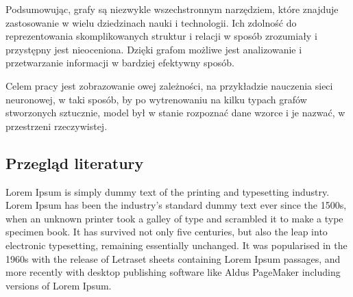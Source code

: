 Podsumowując, grafy są niezwykle wszechstronnym narzędziem, które znajduje zastosowanie w wielu dziedzinach nauki i technologii.
Ich zdolność do reprezentowania skomplikowanych struktur i relacji w sposób zrozumiały i przystępny jest nieoceniona.
Dzięki grafom możliwe jest analizowanie i przetwarzanie informacji w bardziej efektywny sposób. 

Celem pracy jest zobrazowanie owej zależności, na przykładzie nauczenia sieci neuronowej,
w taki sposób, by po wytrenowaniu na kilku typach grafów stworzonych sztucznie,
model był w stanie rozpoznać dane wzorce i je nazwać, w przestrzeni rzeczywistej.

\subsection{Przegląd literatury}
Lorem Ipsum is simply dummy text of the printing and typesetting industry. Lorem Ipsum has been the industry's standard dummy text ever since the 1500s, when an unknown printer took a galley of type and scrambled it to make a type specimen book. It has survived not only five centuries, but also the leap into electronic typesetting, remaining essentially unchanged. It was popularised in the 1960s with the release of Letraset sheets containing Lorem Ipsum passages, and more recently with desktop publishing software like Aldus PageMaker including versions of Lorem Ipsum.
